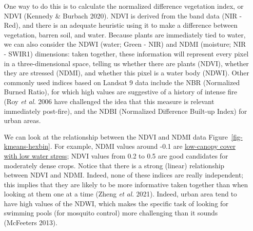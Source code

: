 \documentclass[
  letterpaper,
]{scrbook}
\begin{document}
One way to do this is to calculate the normalized difference vegetation
index, or NDVI (Kennedy \& Burbach 2020). NDVI is derived from the band
data (NIR - Red), and there is an adequate heuristic using it to make a
difference between vegetation, barren soil, and water. Because plants
are immediately tied to water, we can also consider the NDWI (water;
Green - NIR) and NDMI (moisture; NIR - SWIR1) dimensions: taken
together, these information will represent every pixel in a
three-dimensional space, telling us whether there are plants (NDVI),
whether they are stressed (NDMI), and whether this pixel is a water body
(NDWI). Other commonly used indices based on Landsat 9 data include the
NBR (Normalized Burned Ratio), for which high values are suggestive of a
history of intense fire (Roy \emph{et al.} 2006 have challenged the idea
that this measure is relevant immediately post-fire), and the NDBI
(Normalized Difference Built-up Index) for urban areas.

We can look at the relationship between the NDVI and NDMI data
Figure~\ref{fig-kmeans-hexbin}. For example, NDMI values around -0.1 are
\href{https://eos.com/make-an-analysis/ndmi/}{low-canopy cover with low
water stress}; NDVI values from 0.2 to 0.5 are good candidates for
moderately dense crops. Notice that there is a strong (linear)
relationship between NDVI and NDMI. Indeed, none of these indices are
really independent; this implies that they are likely to be more
informative taken together than when looking at them one at a time
(Zheng \emph{et al.} 2021). Indeed, urban area tend to have high values
of the NDWI, which makes the specific task of looking for swimming pools
(for mosquito control) more challenging than it sounds (McFeeters 2013).
\end{document}
